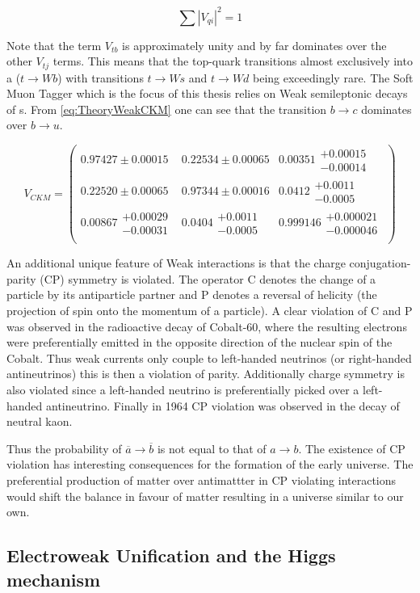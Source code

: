 \begin{equation} 
\label{eq:TheoryWeakMixingTotal}
\sum|V_{qi}|^{2}=1
\end{equation}

Note that the term $V_{tb}$ is approximately unity and by far dominates over the other $V_{tj}$ terms. This means that the top-quark transitions almost exclusively into a \bquark{} ($t\rightarrow Wb$) with transitions $t\rightarrow Ws$ and $t\rightarrow Wd$ being exceedingly rare. The Soft Muon Tagger which is the focus of this thesis relies on Weak semileptonic decays of \bquark{}s. From \ref{eq:TheoryWeakCKM} one can see that the transition $b\rightarrow c$ dominates over $b\rightarrow u$.

\begin{equation}
\label{eq:TheoryWeakCKM}
V_{CKM}
=
\begin{pmatrix}
  0.97427\pm0.00015 & 0.22534\pm0.00065 & 0.00351\substack{+0.00015\\-0.00014} \\
  0.22520\pm0.00065 & 0.97344\pm0.00016 & 0.0412\substack{+0.0011\\-0.0005} \\
  0.00867\substack{+0.00029\\-0.00031} & 0.0404\substack{+0.0011\\-0.0005} & 0.999146\substack{+0.000021\\-0.000046} \\
\end{pmatrix}
\end{equation}

An additional unique feature of Weak interactions is that the charge conjugation-parity (CP) symmetry is violated. The operator C denotes the change of a particle by its antiparticle partner and P denotes a reversal of helicity (the projection of spin onto the momentum of a particle). A clear violation of C and P was observed in the radioactive decay of Cobalt-60, where the resulting electrons were preferentially emitted in the opposite direction of the nuclear spin of the Cobalt. Thus weak currents only couple to left-handed neutrinos (or right-handed antineutrinos) this is then a violation of parity. Additionally charge symmetry is also violated since a left-handed neutrino is preferentially picked over a left-handed antineutrino. Finally in 1964 CP violation was observed in the decay of neutral kaon.

Thus the probability of $\overline{a}\rightarrow \overline{b}$ is not equal to that of $a\rightarrow b$. The existence of CP violation has interesting consequences for the formation of the early universe. The preferential production of matter over antimattter in CP violating interactions would shift the balance in favour of matter resulting in a universe similar to our own.

\subsection{Electroweak Unification and the Higgs mechanism}


